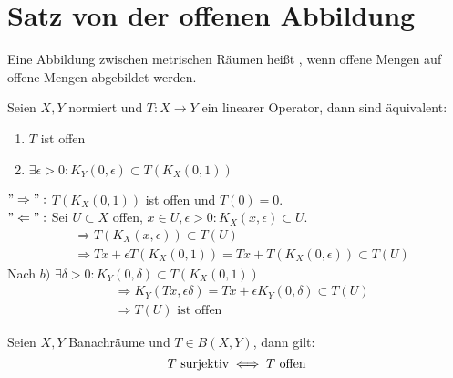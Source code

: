 
\section{Satz von der offenen Abbildung}



\begin{definition} \label{def:10.1-offAbbildung}
	Eine Abbildung zwischen metrischen Räumen heißt , wenn offene Mengen auf offene Mengen abgebildet werden.
\end{definition}


\begin{lemma} \label{lemma:10.2}
	Seien $X, Y$ normiert und $T: X \rightarrow Y$ ein linearer Operator, dann sind äquivalent:
	\begin{enumerate}[label=\alph*\upshape)]
		\item $T$ ist offen
		\item $\exists \epsilon > 0: K_{Y}(0, \epsilon) \subset T(K_{X}(0, 1))$
	\end{enumerate}
\end{lemma}

\begin{beweis}
	$"\Rightarrow":$ $T(K_{X}(0, 1))$ ist offen und $T(0) = 0$. \\
	$"\Leftarrow":$ Sei $U \subset X$ offen, $x \in U, \epsilon > 0: K_{X}(x, \epsilon) \subset U$.
	\begin{align*}
		& \Rightarrow T( K_{X}(x, \epsilon)) \subset T(U) \\
		& \Rightarrow Tx + \epsilon T(K_{X}(0, 1)) = Tx + T(K_{X}(0, \epsilon)) \subset T(U)
	\end{align*}
	Nach $b)$ $\exists \delta > 0: K_{Y}(0, \delta) \subset T(K_{X}(0, 1))$
	\begin{align*}
		& \Rightarrow K_{Y}(Tx, \epsilon \delta) = T x + \epsilon K_{Y}(0, \delta) \subset T(U) \\
		& \Rightarrow T(U) \text{ ist offen}
	\end{align*}	
\end{beweis}


\begin{satz}   \label{satz:10.3-offeneAbbildung}
	Seien $X, Y$ Banachräume und $T \in B(X, Y)$, dann gilt:
	\[ T \text{ surjektiv} \iff T \text{ offen} \]
\end{satz}

